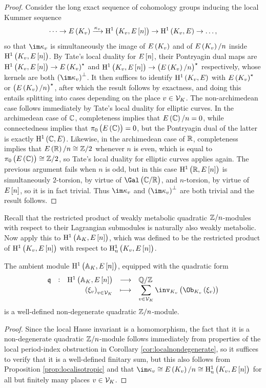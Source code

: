 \begin{proof}
Consider the long exact sequence of cohomology groups inducing the local Kummer sequence
$$ \dots \to E\br{K_v} \xrightarrow{\kappa_v} \HE[n]{K_v} \to \HE{K_v} \to \dots, $$
so that $ \im \kappa_v $ is simultaneously the image of $ E\br{K_v} $ and of $ \En{K_v} $ inside $ \HE[n]{K_v} $. By Tate's local duality for $ E\sbr{n} $, their Pontryagin dual maps are $ \HE[n]{K_v} \to E\br{K_v}^\star $ and $ \HE[n]{K_v} \to \br{\En{K_v}}^\star $ respectively, whose kernels are both $ \br{\im \kappa_v}^\perp $. It then suffices to identify $ \HE{K_v} $ with $ E\br{K_v}^\star $ or $ \br{\En{K_v}}^\star $, after which the result follows by exactness, and doing this entails splitting into cases depending on the place $ v \in \mathcal{V}_K $. The non-archimedean case follows immediately by Tate's local duality for elliptic curves. In the archimedean case of $ \mathbb{C} $, completeness implies that $ \En{\CC} = 0 $, while connectedness implies that $ \pi_0\br{E\br{\CC}} = 0 $, but the Pontryagin dual of the latter is exactly $ \HE{\CC} $. Likewise, in the archimedean case of $ \mathbb{R} $, completeness implies that $ \En{\RR} \cong \ZZ / 2 $ whenever $ n $ is even, which is equal to $ \pi_0\br{E\br{\CC}} \cong \ZZ / 2 $, so Tate's local duality for elliptic curves applies again. The previous argument fails when $ n $ is odd, but in this case $ \HE[n]{\RR} $ is simultaneously $ 2 $-torsion, by virtue of $ \Gal\br{\CC / \RR} $, and $ n $-torsion, by virtue of $ E\sbr{n} $, so it is in fact trivial. Thus $ \im \kappa_v $ and $ \br{\im \kappa_v}^\perp $ are both trivial and the result follows.
\end{proof}

\pagebreak

Recall that the restricted product of weakly metabolic quadratic $ \mathbb{Z} / n $-modules with respect to their Lagrangian submodules is naturally also weakly metabolic. Now apply this to $ \HE[n]{\AA_K} $, which was defined to be the restricted product of $ \HE[n]{K_v} $ with respect to $ \H_\u^1\br{K_v, E\sbr{n}} $.

\begin{corollary}
\label{cor:quadraticmodule}
The ambient module $ \HE[n]{\AA_K} $, equipped with the quadratic form
$$ \function[\qqq]{\HE[n]{\AA_K}}{\QQ / \ZZ}{\br{\xi_v}_{v \in \VVV_K}}{\displaystyle\sum_{v \in \VVV_K} \inv_{K_v}\br{\Ob_{K_v}\br{\xi_v}}} $$
is a well-defined non-degenerate quadratic $ \mathbb{Z} / n $-module.
\end{corollary}

\begin{proof}
Since the local Hasse invariant is a homomorphism, the fact that it is a non-degenerate quadratic $ \mathbb{Z} / n $-module follows immediately from properties of the local period-index obstruction in Corollary \ref{cor:localnondegenerate}, so it suffices to verify that it is a well-defined finitary sum, but this also follows from Proposition \ref{prop:localisotropic} and that $ \im \kappa_v \cong \En{K_v} \cong \H_\u^1\br{K_v, E\sbr{n}} $ for all but finitely many places $ v \in \mathcal{V}_K $.
\end{proof}


